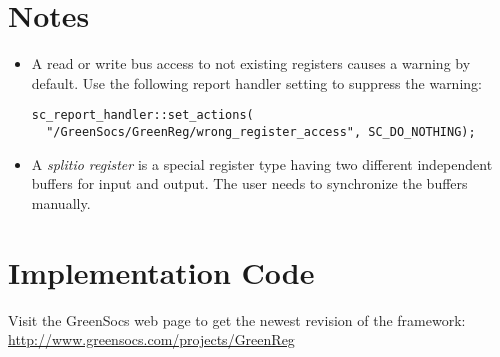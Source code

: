 \section{Notes}
\label{sec:Notes}

\begin{itemize}
	\item A read or write bus access to not existing registers causes a warning by default. \newline
	Use the following report handler setting to suppress the warning:
\begin{lstlisting}
sc_report_handler::set_actions(
  "/GreenSocs/GreenReg/wrong_register_access", SC_DO_NOTHING);
\end{lstlisting}

  \item A {\em splitio register} is a special register type having two different independent buffers for input and output.
The user needs to synchronize the buffers manually.


\end{itemize}


\section{Implementation Code}
\label{sec:ImplementationCode}

Visit the GreenSocs web page to get the newest revision of the \GreenReg framework:\\
\href{http://www.greensocs.com/projects/GreenReg}{http://www.greensocs.com/projects/GreenReg}